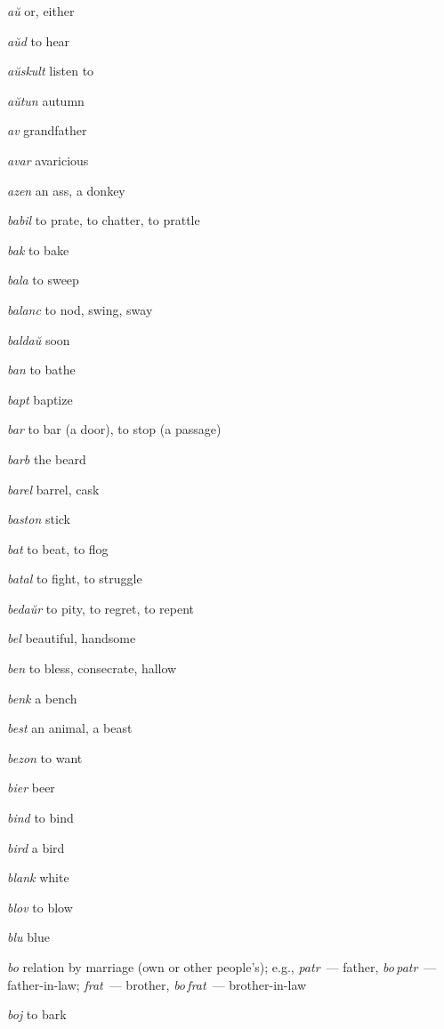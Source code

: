 \begin{landscape}
\begin{multicols}{5}
\begin{outdent}{1em}
\emph{aŭ}  or, either

\emph{aŭd  } to hear

\emph{aŭskult  } listen to

\emph{aŭtun  } autumn

\emph{av  } grandfather

\emph{avar}  avaricious

\emph{azen  } an ass, a donkey
\end{outdent}


\begin{outdent}{1em}
\emph{babil  }to prate, to chatter, to prattle

\emph{bak  }to bake

\emph{bala  }to sweep

\emph{balanc  }to nod, swing, sway

\emph{baldaŭ  }soon

\emph{ban  }to bathe

\emph{bapt  }baptize

\emph{bar  }to bar (a door), to stop (a passage)

\emph{barb  }the beard

\emph{barel  }barrel, cask

\emph{baston  }stick

\emph{bat } to beat, to flog

\emph{batal  }to fight, to struggle

\emph{bedaŭr  }to pity, to regret, to repent

\emph{bel  }beautiful, handsome

\emph{ben  }to bless, consecrate, hallow

\emph{benk  }a bench

\emph{best  }an animal, a beast

\emph{bezon  }to want

\emph{bier  }beer

\emph{bind  }to bind

\emph{bird  }a bird

\emph{blank  }white

\emph{blov  }to blow

\emph{blu  }blue

\emph{bo  }relation by marriage (own or other people’s); e.g., \emph{patr\,} — father, \emph{bo\,patr\,} — father-in-law; \emph{frat\,} — brother, \emph{bo\,frat\,} — brother-in-law

\emph{boj  }to bark


\end{outdent}
\end{multicols}
\end{landscape}
